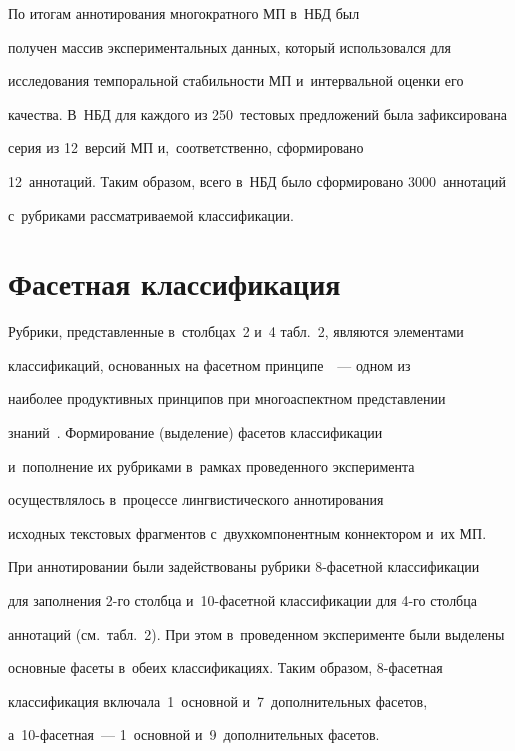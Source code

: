   По итогам аннотирования многократного МП в~НБД был 


получен массив экспериментальных данных, который использовался для 


исследования темпоральной стабильности МП и~интервальной оценки его 


качества. В~НБД для каждого из 250~тестовых предложений была зафиксирована 


серия из 12~версий МП и,~соответственно, сформировано 


12~аннотаций. Таким образом, всего в~НБД было сформировано 3000~аннотаций 


с~рубриками рассматриваемой классификации.


  


\section{Фасетная классификация}





  Рубрики, представленные в~столбцах~2 и~4 табл.~2, являются элементами 


классификаций, основанных на фасетном принципе~\cite{22-eg}~--- одном из 


наиболее продуктивных принципов при многоаспектном представлении 


знаний~\cite{23-eg}. Формирование (выделение) фасетов классификации 


и~пополнение их рубриками в~рамках проведенного эксперимента 


осуществлялось в~процессе лингвистического аннотирования~\cite{24-eg} 


исходных текстовых фрагментов с~двухкомпонентным коннектором и~их МП.


  


  При аннотировании были задействованы рубрики 8-фа\-сет\-ной классификации 


для заполнения 2-го столб\-ца и~10-фа\-сет\-ной классификации для 4-го столб\-ца 


аннотаций (см.\ табл.~2). При этом в~проведенном эксперименте были выделены 


основные фасеты в~обеих классификациях. Таким образом, 8-фа\-сет\-ная 


классификация включала~1~основной и~7~дополнительных фасетов,  


а~10-фа\-сет\-ная~--- 1~основной и~9~дополнительных фасетов.


